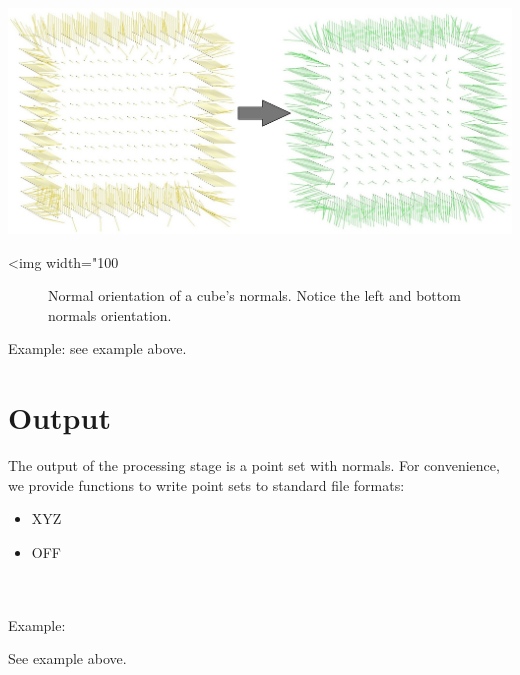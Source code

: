\begin{center}
    \label{Point_set_processing_3-fig-mst_normal_orientation}
    \begin{ccTexOnly}
        \includegraphics[width=1.0\textwidth]{Point_set_processing_3/mst_normal_orientation} %
    \end{ccTexOnly}
    \begin{ccHtmlOnly}
        <img width="100%
    \end{ccHtmlOnly}
    \begin{figure}[h]
        \caption{Normal orientation of a cube's normals. Notice the left and bottom normals orientation.}
    \end{figure}
\end{center}

Example: see  example above.


\section{Output}

The output of the processing stage is a point set with normals.
For convenience, we provide functions to write point sets to standard file formats:
\begin{itemize}
\item XYZ
\item OFF
\end{itemize}

  \\
  \\

Example:

See  example above.

